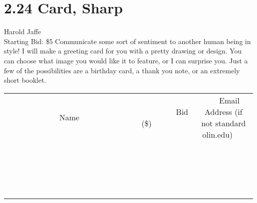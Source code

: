 \documentclass[11pt]{article}
\begin{document}
\section*{2.24 Card, Sharp}
Harold Jaffe
\\
Starting Bid: \$5
\newline
Communicate some sort of sentiment to another human being in style! I will make a greeting card for you with a pretty drawing or design. You can choose what image you would like it to feature, or I can surprise you. Just a few of the possibilities are a birthday card, a thank you note, or an extremely short booklet.
\\[3ex]
\begin{tabular}{c c c}
~~~~~~~~~~~~~Name~~~~~~~~~~~~~ & ~~~~~~~~~Bid (\$)~~~~~~~~~  & ~~~Email Address (if not standard olin.edu)~~~\\
 & & \\
\hline
 & & \\
\hline
 & & \\
\hline
 & & \\
\hline
 & & \\
\hline
 & & \\
\hline
 & & \\
\hline
 & & \\
\hline
 & & \\
\hline
 & & \\
\hline
 & & \\
\hline
 & & \\
\hline
 & & \\
\hline
 & & \\
\hline
 & & \\
\hline
 & & \\
\hline
 & & \\
\hline
 & & \\
\hline
 & & \\
\hline
\end{tabular}
\newpage
\end{document}
